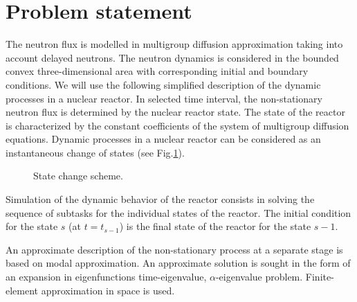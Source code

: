\documentclass[a4paper]{jpconf}
\begin{document}
\section{Problem statement}

The neutron flux is modelled in multigroup diffusion approximation taking into account delayed neutrons. The neutron dynamics is considered in the bounded convex three-dimensional area with corresponding initial and
boundary conditions. We will use the following simplified description of the dynamic processes in a nuclear reactor. In selected time interval, the non-stationary neutron flux is determined by the nuclear reactor state. The state of the reactor is characterized by the constant coefficients of the system of multigroup diffusion equations. Dynamic processes in a nuclear reactor can be considered as an instantaneous change of states (see  Fig.\ref{fig:1}).
\begin{figure}[] 
  \begin{center}
\vspace{5mm} 
    \caption{State change scheme.} 
   \label{fig:1}
  \end{center}
\end{figure}

Simulation of the dynamic behavior of the reactor consists in solving the sequence of subtasks for the individual states of the reactor. The initial condition for the state $s$ (at $t = t_{s-1}$) is the final state of the reactor for the state $s-1$.

An approximate description of the non-stationary process at a separate stage is based on modal approximation. An approximate solution is sought in the form of an expansion in eigenfunctions time-eigenvalue, $\alpha$-eigenvalue problem. Finite-element approximation in space is used. 
\end{document}

